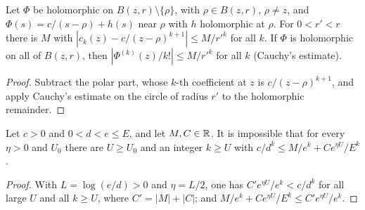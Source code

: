 \begin{lemma}\label{an:pole-asym}
Let $\Phi$ be holomorphic on $B(z,r)\setminus\{\rho\}$, with $\rho\in
B(z,r)$, $\rho\ne z$, and $\Phi(s)=c/(s-\rho)+h(s)$ near $\rho$ with $h$
holomorphic at $\rho$. For $0<r'<r$ there is $M$ with
$|c_k(z)-c/(z-\rho)^{k+1}|\le M/r'^k$ for all $k$. If $\Phi$ is
holomorphic on all of $B(z,r)$, then $|\Phi^{(k)}(z)/k!|\le M/r'^k$ for all
$k$ (Cauchy's estimate).
\end{lemma}
\begin{proof}
Subtract the polar part, whose $k$-th coefficient at $z$ is
$c/(z-\rho)^{k+1}$, and apply Cauchy's estimate on the circle of radius
$r'$ to the holomorphic remainder.
\end{proof}

\begin{lemma}\label{an:growth-contra}
Let $c>0$ and $0<d<e\le E$, and let $M,C\in\mathbb{R}$. It is impossible that for
every $\eta>0$ and $U_0$ there are $U\ge U_0$ and an integer $k\ge U$ with
$c/d^k\le M/e^k+Ce^{\eta U}/E^k$.
\end{lemma}
\begin{proof}
With $L=\log(e/d)>0$ and $\eta=L/2$, one has
$C'e^{\eta U}/e^k<c/d^k$ for all large $U$ and all $k\ge U$, where
$C'=|M|+|C|$; and $M/e^k+Ce^{\eta U}/E^k\le C'e^{\eta U}/e^k$.
\end{proof}

